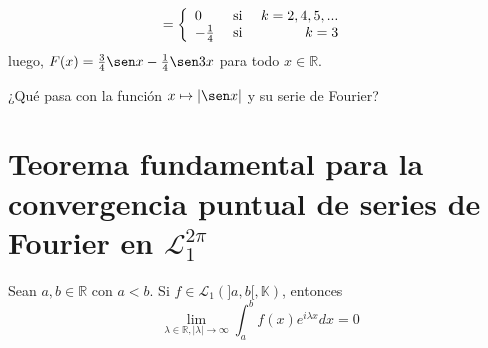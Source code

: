 \documentclass[12pt]{report}
\theoremstyle{largebreak}
\newcommand\abs[1]{\ensuremath{\left|#1\right|}}
\begin{document}
\begin{exa}
\begin{equation*}
\begin{split}
                &=\left\{
                    \begin{array}{lcr}
                        0 & \textup{ si } & k=2,4,5,...\\
                        -\frac{1}{4} & \textup{ si } & k=3\\
                    \end{array}
                \right.
            \end{split}
        \end{equation*}
        luego, $F(x)=\frac{3}{4}\sen x-\frac{1}{4}\sen 3x$ para todo $x\in\mathbb{R}$.
    \end{exa}

    \begin{exa}
        ¿Qué pasa con la función $x\mapsto\abs{\sen x}$ y su serie de Fourier?
    \end{exa}

    \section{Teorema fundamental para la convergencia puntual de series de Fourier en $\mathcal{L}_1^{2\pi}$}

    \begin{theor}
        Sean $a,b\in\mathbb{R}$ con $a<b$. Si $f\in\mathcal{L}_1(]a,b[,\mathbb{K})$, entonces
        \begin{equation*}
            \lim_{\lambda\in\mathbb{R},|\lambda|\rightarrow\infty }\int_{a}^bf(x)e^{ i\lambda x}dx=0
        \end{equation*}
    \end{theor}
\end{document}
